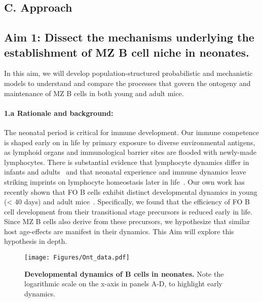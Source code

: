 \documentclass[11pt]{article}
\newcommand{\para}[1]{\vspace*{-4.5mm}\paragraph{#1}}
\begin{document}
    




\subsection*{C. Approach}
\vspace{-1mm}
\subsection*{Aim 1: Dissect the mechanisms underlying the establishment of MZ B cell niche in neonates.}

In this aim, we will develop population-structured probabilistic and mechanistic models to understand and compare the processes that govern the ontogeny and maintenance of  MZ B cells in both young and adult mice.

\para{{1.a Rationale and background:}}
The neonatal period is critical for immune development.
Our immune competence is shaped early on in life by primary exposure to diverse environmental antigens, as lymphoid organs and immunological barrier sites are flooded with newly-made lymphocytes.
There is substantial evidence that lymphocyte dynamics differ in infants and adults~\cite{LeCampion_2002, Scho_nland_2003, Reynaldi_2019, Rane_2022} and that neonatal experience and immune dynamics leave striking imprints on lymphocyte homeostasis later in life~\cite{Farber_2013, Hogan_2019, Gaimann_2020, Davenport_2020}.  
Our own work has recently shown that FO B cells exhibit distinct developmental dynamics in young (< 40 days) and adult mice~\cite{Verheijen_2020}.
Specifically, we found that the efficiency of FO B cell development from their transitional stage precursors is reduced early in life. 
Since MZ B cells also derive from these precursors, we hypothesize that similar host age-effects are manifest in their dynamics.
This Aim will explore this hypothesis in depth.

\begin{wrapfigure}{r}{0.36\textwidth}
\centering
\vspace*{-5mm}
\texttt{[image: Figures/Ont\_data.pdf]}
\vspace*{-2mm}
\caption{\textbf{Developmental dynamics of B cells in neonates.} 
Note the logarithmic scale on the x-axis in panels A-D, to highlight early dynamics.
}
\vspace*{-5mm}
\label{fig:Ont_data}\end{wrapfigure}
\end{document}
